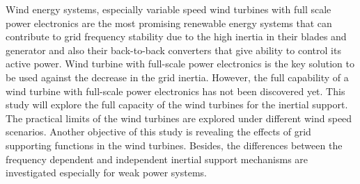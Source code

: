 Wind energy systems, especially variable speed wind turbines with full scale power electronics are the most promising renewable energy systems that can contribute to grid frequency stability due to the high inertia in their blades and generator and also their back-to-back converters that give ability to control its active power. Wind turbine with full-scale power electronics is the key solution to be used against the decrease in the grid inertia. However, the full capability of a wind turbine with full-scale power electronics has not been discovered yet. This study will explore the full capacity of the wind turbines for the inertial support. The practical limits of the wind turbines are explored under different wind speed scenarios. Another objective of this study is revealing the effects of grid supporting functions in the wind turbines. Besides, the differences between the frequency dependent and independent inertial support mechanisms are investigated especially for weak power systems.
